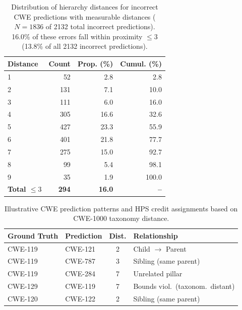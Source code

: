 \documentclass[lettersize,journal]{IEEEtran}
\begin{document}
\begin{table}[!t]
\centering
\caption{Distribution of hierarchy distances for incorrect CWE predictions with
measurable distances ($N=1836$ of 2132 total incorrect predictions).
16.0\% of these errors fall within proximity $\leq 3$ (13.8\% of all 2132 incorrect predictions).}
\label{tab:hierarchy_distance_dist}
\footnotesize
\renewcommand{\arraystretch}{1.0}
\setlength{\tabcolsep}{8pt}
\begin{tabular}{lrrr}
\toprule
\textbf{Distance} & \textbf{Count} & \textbf{Prop. (\%)} & \textbf{Cumul. (\%)} \\
\midrule
1 &  52 &  2.8 &  2.8 \\
2 & 131 &  7.1 & 10.0 \\
3 & 111 &  6.0 & 16.0 \\
4 & 305 & 16.6 & 32.6 \\
5 & 427 & 23.3 & 55.9 \\
6 & 401 & 21.8 & 77.7 \\
7 & 275 & 15.0 & 92.7 \\
8 &  99 &  5.4 & 98.1 \\
9 &  35 &  1.9 & 100.0 \\
\midrule
\textbf{Total $\leq 3$} & \textbf{294} & \textbf{16.0} & \textbf{--} \\
\bottomrule
\end{tabular}
\end{table}

\begin{table}[!t]
\centering
\caption{Illustrative CWE prediction patterns and HPS credit assignments based on CWE-1000 taxonomy distance.}
\label{tab:hps_examples}
\footnotesize
\renewcommand{\arraystretch}{1.0}
\setlength{\tabcolsep}{4pt}
\begin{minipage}{\columnwidth}
\begin{tabular*}{\columnwidth}{@{\extracolsep{\fill}}llcl@{}}
\toprule
\textbf{Ground Truth} & \textbf{Prediction} & \textbf{Dist.} & \textbf{Relationship} \\
\midrule
CWE-119 & CWE-121 & 2 & Child $\rightarrow$ Parent \\
CWE-119 & CWE-787 & 3 & Sibling (same parent) \\
CWE-119 & CWE-284 & 7 & Unrelated pillar \\
CWE-129 & CWE-119 & 7 & Bounds viol.\ (taxonom.\ distant) \\
CWE-120 & CWE-122 & 2 & Sibling (same parent) \\
\bottomrule
\end{tabular*}
\end{minipage}
\end{table}
\end{document}
